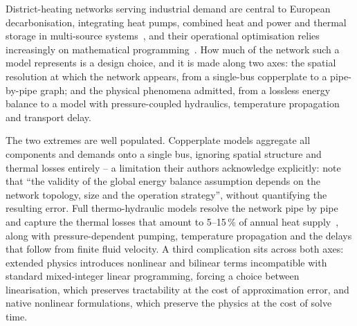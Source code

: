
District-heating networks serving industrial demand are central to European
decarbonisation, integrating heat pumps, combined heat and power and thermal storage in
multi-source systems~\cite{Lund2014_4GDH}, and their operational optimisation relies
increasingly on mathematical programming~\cite{PereaMoreno2026}. How much of the network
such a model represents is a design choice, and it is made along two axes: the spatial
resolution at which the network appears, from a single-bus copperplate to a pipe-by-pipe
graph; and the physical phenomena admitted, from a lossless energy balance to a model with
pressure-coupled hydraulics, temperature propagation and transport delay.

The two extremes are well populated. Copperplate models aggregate all components and
demands onto a single bus, ignoring spatial structure and thermal losses entirely --
a limitation their authors acknowledge explicitly: \citet{Wirtz2020} note that ``the
validity of the global energy balance assumption depends on the network topology, size and
the operation strategy'', without quantifying the resulting error. Full thermo-hydraulic
models resolve the network pipe by pipe and capture the thermal losses that amount to
5--15\,\% of annual heat supply~\cite{Frederiksen2013}, along with pressure-dependent
pumping, temperature propagation and the delays that follow from finite fluid velocity. A
third complication sits across both axes: extended physics introduces nonlinear and
bilinear terms incompatible with standard mixed-integer linear programming, forcing a
choice between linearisation, which preserves tractability at the cost of approximation
error, and native nonlinear formulations, which preserve the physics at the cost of solve
time.

